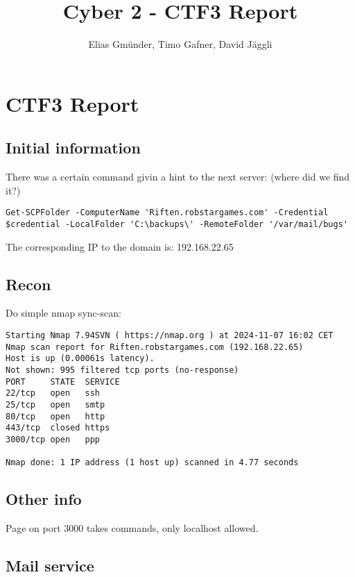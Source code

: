 \documentclass[titlepage]{article} %
\author{Elias Gmünder, Timo Gafner, David Jäggli}
\title{Cyber 2 - CTF3 Report}
\begin{document}
\maketitle
\makeatletter


\section{CTF3 Report}%
\label{sec:CTF3 Report}


\subsection{Initial information}%
\label{sub:Initial information}

There was a certain command givin a hint to the next server: (where did we find it?)

\begin{verbatim}
Get-SCPFolder -ComputerName 'Riften.robstargames.com' -Credential $credential -LocalFolder 'C:\backups\' -RemoteFolder '/var/mail/bugs'
\end{verbatim}

The corresponding IP to the domain is: 192.168.22.65


\subsection{Recon}
\label{ssub:recon}


Do simple nmap sync-scan:

\begin{verbatim}
Starting Nmap 7.94SVN ( https://nmap.org ) at 2024-11-07 16:02 CET
Nmap scan report for Riften.robstargames.com (192.168.22.65)
Host is up (0.00061s latency).
Not shown: 995 filtered tcp ports (no-response)
PORT     STATE  SERVICE
22/tcp   open   ssh
25/tcp   open   smtp
80/tcp   open   http
443/tcp  closed https
3000/tcp open   ppp

Nmap done: 1 IP address (1 host up) scanned in 4.77 seconds
\end{verbatim}

\subsection{Other info}
\label{sub:Other info}

Page on port 3000 takes commands, only localhost allowed.


\subsection{Mail service}
\label{sub:Mail service}
\end{document}
